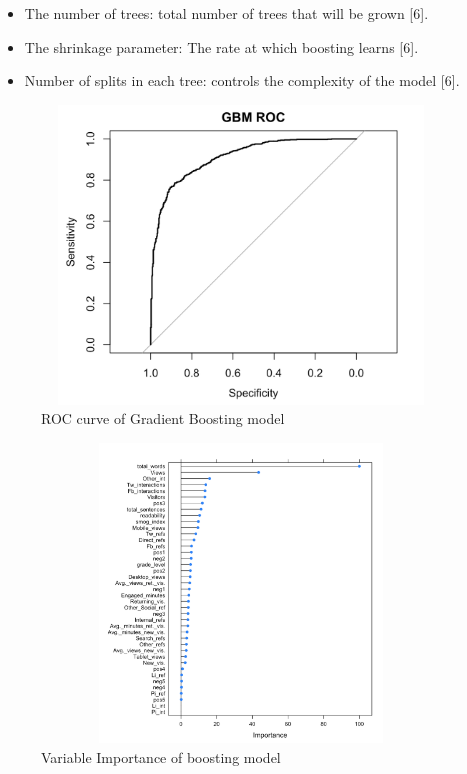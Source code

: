\documentclass[10pt,letterpaper]{article}
\providecommand{\tightlist}{%
  \setlength{\itemsep}{0pt}\setlength{\parskip}{0pt}}
\begin{document}
\begin{itemize}
\tightlist
\item
  The number of trees: total number of trees that will be grown {[}6{]}.
\item
  The shrinkage parameter: The rate at which boosting learns {[}6{]}.
\item
  Number of splits in each tree: controls the complexity of the model
  {[}6{]}.
\end{itemize}

\begin{figure}
\includegraphics[width=400px,height=300px]{roc_gbm} \caption{ROC curve of Gradient Boosting model}\label{fig:unnamed-chunk-1}
\end{figure}

\begin{figure}
\includegraphics[width=400px,height=300px]{boost_VarImp} \caption{Variable Importance of boosting model}\label{fig:unnamed-chunk-2}
\end{figure}
\end{document}
